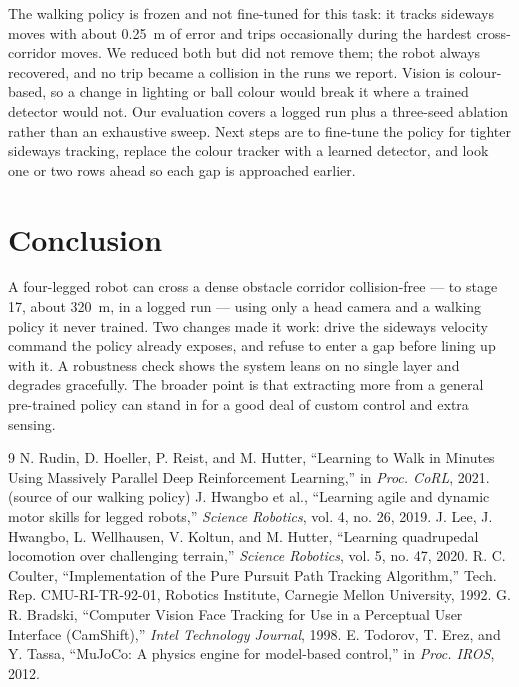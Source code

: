 \documentclass[conference]{IEEEtran}
\begin{document}
The walking policy is frozen and not fine-tuned for this task: it tracks sideways moves
with about 0.25~m of error and trips occasionally during the hardest cross-corridor moves.
We reduced both but did not remove them; the robot always recovered, and no trip became a
collision in the runs we report. Vision is colour-based, so a change in lighting or ball
colour would break it where a trained detector would not. Our evaluation covers a logged run
plus a three-seed ablation rather than an exhaustive sweep. Next steps are to fine-tune the
policy for tighter sideways tracking, replace the colour tracker with a learned detector,
and look one or two rows ahead so each gap is approached earlier.

\section{Conclusion}
A four-legged robot can cross a dense obstacle corridor collision-free --- to stage 17,
about 320~m, in a logged run --- using only a head camera and a walking policy it never
trained. Two changes made it work: drive the sideways velocity command the policy already
exposes, and refuse to enter a gap before lining up with it. A robustness check shows the system
leans on no single layer and degrades gracefully. The broader point is that extracting more
from a general pre-trained policy can stand in for a good deal of custom control and extra
sensing.

\begin{thebibliography}{9}
 N. Rudin, D. Hoeller, P. Reist, and M. Hutter, ``Learning to Walk in
Minutes Using Massively Parallel Deep Reinforcement Learning,'' in \emph{Proc. CoRL},
2021. (source of our walking policy)
 J. Hwangbo et al., ``Learning agile and dynamic motor skills for
legged robots,'' \emph{Science Robotics}, vol. 4, no. 26, 2019.
 J. Lee, J. Hwangbo, L. Wellhausen, V. Koltun, and M. Hutter, ``Learning
quadrupedal locomotion over challenging terrain,'' \emph{Science Robotics}, vol. 5,
no. 47, 2020.
 R. C. Coulter, ``Implementation of the Pure Pursuit Path Tracking
Algorithm,'' Tech. Rep. CMU-RI-TR-92-01, Robotics Institute, Carnegie Mellon
University, 1992.
 G. R. Bradski, ``Computer Vision Face Tracking for Use in a Perceptual
User Interface (CamShift),'' \emph{Intel Technology Journal}, 1998.
 E. Todorov, T. Erez, and Y. Tassa, ``MuJoCo: A physics engine for
model-based control,'' in \emph{Proc. IROS}, 2012.
\end{thebibliography}
\end{document}
